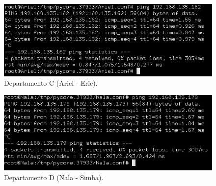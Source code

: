     \begin{minipage}{0.5\linewidth}
    \centering
         \begin{figure}[H]
        \includegraphics[width=\linewidth]{images/ParteII/Questao3/questao3-DepC-Ariel-Eric.jpg}
        \caption{Departamento C (Ariel - Eric).} \label{parteII-questao3-ping-Ariel-Eric}
        \end{figure}
    \end{minipage}
    \begin{minipage}{0.5\linewidth}
    \centering
        \begin{figure}[H]
        \includegraphics[width=\linewidth]{images/ParteII/Questao3/questao3-DepD-Nala-Simba.jpg}
        \caption{Departamento D (Nala - Simba).} \label{parteII-questao3-ping-Nala-Simba}
        \end{figure}    
    \end{minipage}
    
    
